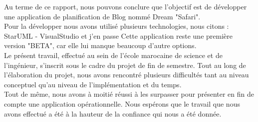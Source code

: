 
\vspace{1cm}\vspace{1cm}\vspace{1cm}\vspace{1cm}\vspace{1cm}
Au terme de ce rapport, nous pouvons conclure que l’objectif est de 
développer une application de planification de Blog nommé Dream 
"Safari".  \\
Pour la développer nous avons utilisé plusieurs technologies, nous 
citons :  StarUML - VisualStudio et j'en passe
Cette application reste une première version "BETA", car elle lui manque beaucoup d'autre options. \\
Le présent travail, effectué au sein de l’école marocaine de science et de 
l’ingénieur, s’inscrit sous le cadre du projet de fin de semestre. Tout au 
long de l’élaboration du projet, nous avons rencontré plusieurs difficultés 
tant au niveau conceptuel qu’au niveau de l’implémentation et du temps. \\
Tout de même, nous avons à moitié réussi à les surpasser pour 
présenter en fin de compte une application opérationnelle.  
Nous espérons que le travail que nous avons effectué a été à la hauteur 
de la confiance qui nous a été donnée.